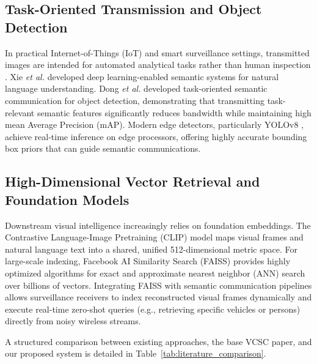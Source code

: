 \documentclass[journal,twocolumn]{IEEEtran}
\begin{document}
\subsection{Task-Oriented Transmission and Object Detection}
In practical Internet-of-Things (IoT) and smart surveillance settings, transmitted images are intended for automated analytical tasks rather than human inspection \cite{kang2022task, shao2023task}. Xie \textit{et al.} \cite{xie2021deep} developed deep learning-enabled semantic systems for natural language understanding. Dong \textit{et al.} \cite{dong2023task} developed task-oriented semantic communication for object detection, demonstrating that transmitting task-relevant semantic features significantly reduces bandwidth while maintaining high mean Average Precision (mAP). Modern edge detectors, particularly YOLOv8 \cite{jocher2023ultralytics}, achieve real-time inference on edge processors, offering highly accurate bounding box priors that can guide semantic communications.

\subsection{High-Dimensional Vector Retrieval and Foundation Models}
Downstream visual intelligence increasingly relies on foundation embeddings. The Contrastive Language-Image Pretraining (CLIP) model \cite{radford2021learning} maps visual frames and natural language text into a shared, unified 512-dimensional metric space. For large-scale indexing, Facebook AI Similarity Search (FAISS) \cite{johnson2019billion} provides highly optimized algorithms for exact and approximate nearest neighbor (ANN) search over billions of vectors. Integrating FAISS with semantic communication pipelines allows surveillance receivers to index reconstructed visual frames dynamically and execute real-time zero-shot queries (e.g., retrieving specific vehicles or persons) directly from noisy wireless streams.

A structured comparison between existing approaches, the base VCSC paper, and our proposed system is detailed in Table~\ref{tab:literature_comparison}.
\end{document}
